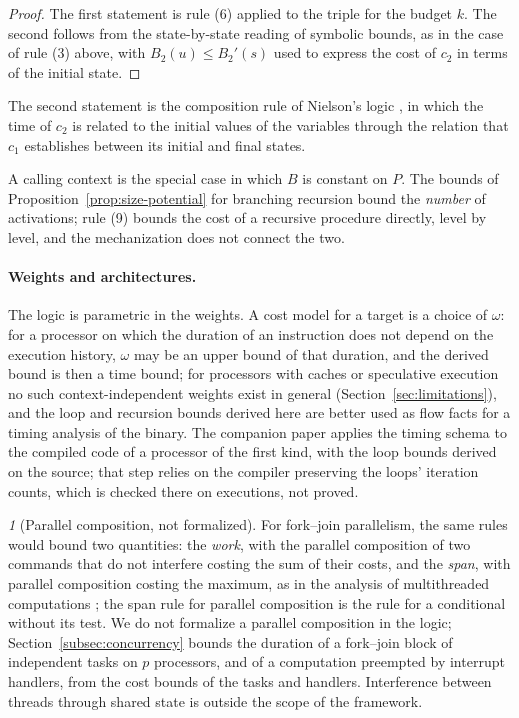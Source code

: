 \documentclass[oneside,english]{amsart}
\numberwithin{equation}{section}
\numberwithin{figure}{section}
\theoremstyle{plain}
\theoremstyle{definition}
\theoremstyle{plain}
\theoremstyle{remark}
\newtheorem*{rem*}{\protect\remarkname}
\theoremstyle{plain}
\theoremstyle{definition}
\theoremstyle{plain}
\theoremstyle{remark}
\providecommand{\remarkname}{Remark}
\begin{document}
\begin{proof}
The first statement is rule (6) applied to the triple for the budget $k$. The second follows from the state-by-state reading of symbolic bounds, as in the case of rule (3) above, with $B_2(u) \le B_2'(s)$ used to express the cost of $c_2$ in terms of the initial state.
\end{proof}

The second statement is the composition rule of Nielson's logic \cite[rule R-3]{nielson1987hoare}, in which the time of $c_2$ is related to the initial values of the variables through the relation that $c_1$ establishes between its initial and final states.

A calling context is the special case in which $B$ is constant on $P$. The bounds of Proposition~\ref{prop:size-potential} for branching recursion bound the \emph{number} of activations; rule (9) bounds the cost of a recursive procedure directly, level by level, and the mechanization does not connect the two.

\paragraph{Weights and architectures.}
The logic is parametric in the weights. A cost model for a target is a choice of $\omega$: for a processor on which the duration of an instruction does not depend on the execution history, $\omega$ may be an upper bound of that duration, and the derived bound is then a time bound; for processors with caches or speculative execution no such context-independent weights exist in general (Section~\ref{sec:limitations}), and the loop and recursion bounds derived here are better used as flow facts for a timing analysis of the binary. The companion paper \cite{crosscheckTool} applies the timing schema to the compiled code of a processor of the first kind, with the loop bounds derived on the source; that step relies on the compiler preserving the loops' iteration counts, which is checked there on executions, not proved.

\begin{rem*}[Parallel composition, not formalized]
For fork--join parallelism, the same rules would bound two quantities: the \emph{work}, with the parallel composition of two commands that do not interfere costing the sum of their costs, and the \emph{span}, with parallel composition costing the maximum, as in the analysis of multithreaded computations \cite{blumofe1999scheduling}; the span rule for parallel composition is the rule for a conditional without its test. We do not formalize a parallel composition in the logic; Section~\ref{subsec:concurrency} bounds the duration of a fork--join block of independent tasks on $p$ processors, and of a computation preempted by interrupt handlers, from the cost bounds of the tasks and handlers. Interference between threads through shared state is outside the scope of the framework.
\end{rem*}
\end{document}
